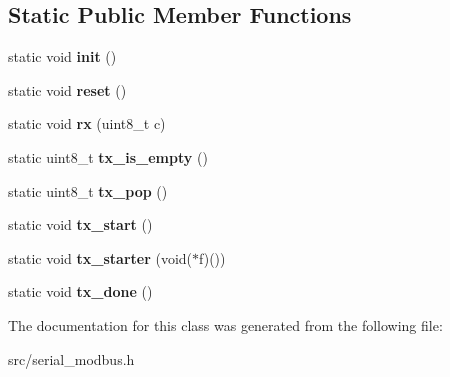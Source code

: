 \subsection*{Static Public Member Functions}
\begin{DoxyCompactItemize}
\item 
static void {\bfseries init} ()\hypertarget{classSerialModbus_ad8f96c1efa89ccbb10186b9b77ea2bc1}{}\label{classSerialModbus_ad8f96c1efa89ccbb10186b9b77ea2bc1}

\item 
static void {\bfseries reset} ()\hypertarget{classSerialModbus_a0ae598204577db1fd82e68d2b41930b8}{}\label{classSerialModbus_a0ae598204577db1fd82e68d2b41930b8}

\item 
static void {\bfseries rx} (uint8\+\_\+t c)\hypertarget{classSerialModbus_a9926866e6d3f6149d0114b5a451c0d0d}{}\label{classSerialModbus_a9926866e6d3f6149d0114b5a451c0d0d}

\item 
static uint8\+\_\+t {\bfseries tx\+\_\+is\+\_\+empty} ()\hypertarget{classSerialModbus_a40a4049b9d9d1a544527d6fa00368d4b}{}\label{classSerialModbus_a40a4049b9d9d1a544527d6fa00368d4b}

\item 
static uint8\+\_\+t {\bfseries tx\+\_\+pop} ()\hypertarget{classSerialModbus_ad54e0c898019b1a054d5e16545dfd77e}{}\label{classSerialModbus_ad54e0c898019b1a054d5e16545dfd77e}

\item 
static void {\bfseries tx\+\_\+start} ()\hypertarget{classSerialModbus_a1a357b1926059d1a5de9f67d0dfbc58d}{}\label{classSerialModbus_a1a357b1926059d1a5de9f67d0dfbc58d}

\item 
static void {\bfseries tx\+\_\+starter} (void($\ast$f)())\hypertarget{classSerialModbus_aea9b2c09800c4a2abf06c8451ba10694}{}\label{classSerialModbus_aea9b2c09800c4a2abf06c8451ba10694}

\item 
static void {\bfseries tx\+\_\+done} ()\hypertarget{classSerialModbus_a3734d117de4c94df22bbbe09d4e5782d}{}\label{classSerialModbus_a3734d117de4c94df22bbbe09d4e5782d}

\end{DoxyCompactItemize}


The documentation for this class was generated from the following file\+:\begin{DoxyCompactItemize}
\item 
src/serial\+\_\+modbus.\+h\end{DoxyCompactItemize}
